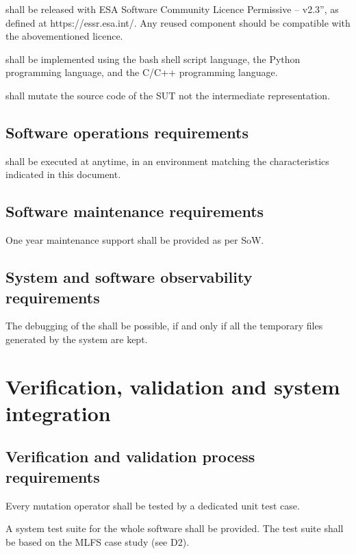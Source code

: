 \RQ{} \FAQAS shall be released with ESA Software Community Licence Permissive – v2.3”, as defined at https://essr.esa.int/. Any reused component should be compatible with the abovementioned licence.

\RQ{} \FAQAS shall be implemented using the bash shell script language, the Python programming language, and the C/C++ programming language.

\RQ{} \FAQAS shall mutate the source code of the SUT not the intermediate representation.

\subsection{Software operations requirements}

\RQ{} \FAQAS shall be executed at anytime, 
in an environment matching the characteristics indicated in this document.

\subsection{Software maintenance requirements}

\RQ{} One year maintenance support shall be provided as per SoW.

\subsection{System and software observability requirements}

\RQ{} The debugging of the \FAQAS shall be possible, if and only if 
all the temporary files generated by the system are kept.

\section{Verification, validation and system integration}
 \subsection{Verification and validation process requirements}
 
 \RQ{} Every mutation operator shall be tested by a dedicated unit test case.
 
 \RQ{} A system test suite for the whole software shall be provided. The test suite shall be based on the MLFS case study (see D2).
 
